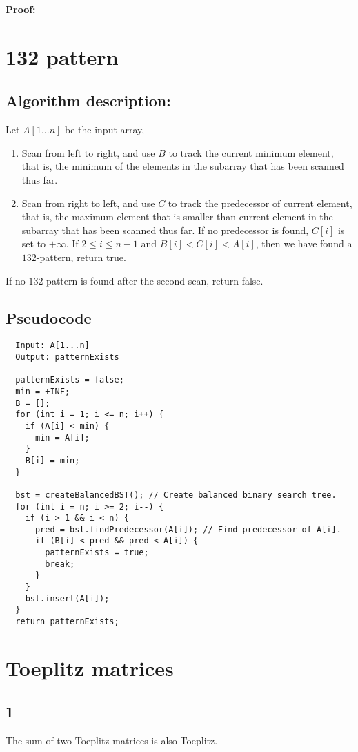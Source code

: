 \documentclass[paper=a4, fontsize=11pt]{scrartcl} %
\numberwithin{equation}{section} %
\numberwithin{figure}{section} %
\numberwithin{table}{section} %
\numberwithin{claimcounter}{section}
\begin{document}
\textbf{Proof:}

\section{132 pattern}
\subsection*{Algorithm description:}
Let $A[1...n]$ be the input array,
\begin{enumerate}
\item Scan from left to right, and use $B$ to track the current minimum element,
that is, the minimum of the elements in the subarray that has been scanned thus 
far.

\item Scan from right to left, and use $C$ to track the predecessor of current
element, that is, the maximum element that is smaller than current element in
the subarray that has been scanned thus far. If no predecessor is found, $C[i]$
is set to $+\infty$. If $2 \leq i \leq n-1$ and $B[i] < C[i] < A[i]$, then we have found a
$132$-pattern, return true. 

\end{enumerate}
If no $132$-pattern is found after the second scan, return false.

\subsection*{Pseudocode}
\begin{verbatim}
  Input: A[1...n]
  Output: patternExists
  
  patternExists = false;
  min = +INF;
  B = [];
  for (int i = 1; i <= n; i++) {
    if (A[i] < min) {
      min = A[i];
    }
    B[i] = min;
  }
  
  bst = createBalancedBST(); // Create balanced binary search tree.
  for (int i = n; i >= 2; i--) {
    if (i > 1 && i < n) {
      pred = bst.findPredecessor(A[i]); // Find predecessor of A[i].
      if (B[i] < pred && pred < A[i]) {
        patternExists = true;
        break;
      }
    }
    bst.insert(A[i]);
  }
  return patternExists;
\end{verbatim}

\section{Toeplitz matrices}
\subsection*{1}
The sum of two Toeplitz matrices is also Toeplitz.
\end{document}

